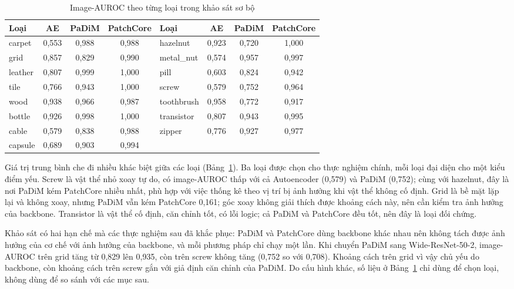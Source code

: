 \begin{table}[htbp]
  \centering
  \caption{Image-AUROC theo từng loại trong khảo sát sơ bộ}
  \label{tab:khao-sat-loai}
  \small
  \begin{tabular}{@{}lccc@{\hspace{1.2cm}}lccc@{}}
    \toprule
    Loại & AE & PaDiM & PatchCore & Loại & AE & PaDiM & PatchCore \\
    \midrule
    carpet  & 0,553 & 0,988 & 0,988 & hazelnut   & 0,923 & 0,720 & 1,000 \\
    grid    & 0,857 & 0,829 & 0,990 & metal\_nut & 0,574 & 0,957 & 0,997 \\
    leather & 0,807 & 0,999 & 1,000 & pill       & 0,603 & 0,824 & 0,942 \\
    tile    & 0,766 & 0,943 & 1,000 & screw      & 0,579 & 0,752 & 0,964 \\
    wood    & 0,938 & 0,966 & 0,987 & toothbrush & 0,958 & 0,772 & 0,917 \\
    bottle  & 0,926 & 0,998 & 1,000 & transistor & 0,807 & 0,943 & 0,995 \\
    cable   & 0,579 & 0,838 & 0,988 & zipper     & 0,776 & 0,927 & 0,977 \\
    capsule & 0,689 & 0,903 & 0,994 &            &       &       &       \\
    \bottomrule
  \end{tabular}
\end{table}

Giá trị trung bình che đi nhiều khác biệt giữa các loại (Bảng~\ref{tab:khao-sat-loai}). Ba loại được chọn cho thực
nghiệm chính, mỗi loại đại diện cho một kiểu điểm yếu. Screw là vật thể nhỏ xoay tự do, có image-AUROC thấp với cả
Autoencoder (0,579) và PaDiM (0,752); cùng với hazelnut, đây là nơi PaDiM kém PatchCore nhiều nhất, phù hợp với việc
thống kê theo vị trí bị ảnh hưởng khi vật thể không cố định. Grid là bề mặt lặp lại và không xoay, nhưng PaDiM vẫn
kém PatchCore 0,161; góc xoay không giải thích được khoảng cách này, nên cần kiểm tra ảnh hưởng của backbone.
Transistor là vật thể cố định, căn chỉnh tốt, có lỗi logic; cả PaDiM và PatchCore đều tốt, nên đây là loại đối
chứng.

Khảo sát có hai hạn chế mà các thực nghiệm sau đã khắc phục: PaDiM và PatchCore dùng backbone khác nhau nên không tách
được ảnh hưởng của cơ chế với ảnh hưởng của backbone, và mỗi phương pháp chỉ chạy một lần. Khi chuyển PaDiM sang
Wide-ResNet-50-2, image-AUROC trên grid tăng từ 0,829 lên 0,935, còn trên screw không tăng (0,752 so với 0,708). Khoảng
cách trên grid vì vậy chủ yếu do backbone, còn khoảng cách trên screw gắn với giả định căn chỉnh của PaDiM. Do cấu
hình khác, số liệu ở Bảng~\ref{tab:khao-sat-loai} chỉ dùng để chọn loại, không dùng để so sánh với các mục sau.
